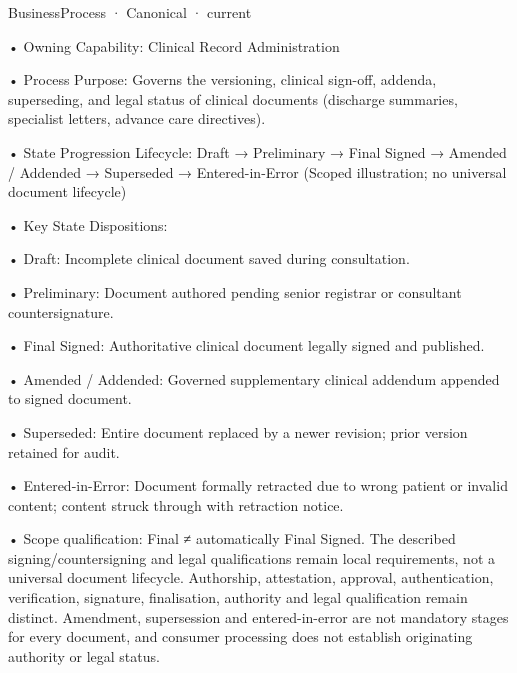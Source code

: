 \label{element:eacdec16b96844b4963b8a960d1a8666}
{\small BusinessProcess · Canonical · current}\par

•
Owning Capability: Clinical Record Administration



•
Process Purpose: Governs the versioning, clinical sign-off, addenda, superseding, and legal status of clinical documents (discharge summaries, specialist letters, advance care directives).



•
State Progression Lifecycle: Draft → Preliminary → Final Signed → Amended / Addended → Superseded → Entered-in-Error   (Scoped illustration; no universal document lifecycle)



•
Key State Dispositions:



•
Draft: Incomplete clinical document saved during consultation.



•
Preliminary: Document authored pending senior registrar or consultant countersignature.



•
Final Signed: Authoritative clinical document legally signed and published.



•
Amended / Addended: Governed supplementary clinical addendum appended to signed document.



•
Superseded: Entire document replaced by a newer revision; prior version retained for audit.



•
Entered-in-Error: Document formally retracted due to wrong patient or invalid content; content struck through with retraction notice.



•
Scope qualification: Final ≠ automatically Final Signed. The described signing/countersigning and legal qualifications remain local requirements, not a universal document lifecycle. Authorship, attestation, approval, authentication, verification, signature, finalisation, authority and legal qualification remain distinct. Amendment, supersession and entered-in-error are not mandatory stages for every document, and consumer processing does not establish originating authority or legal status.



